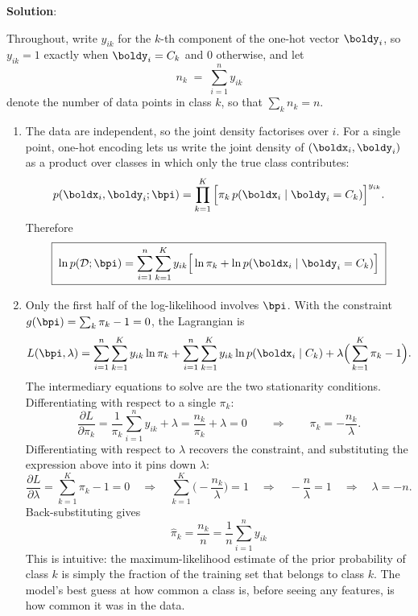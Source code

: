 \documentclass[submit]{../harvardml}
\newenvironment{solution}{
    \vspace{2mm}
    \color{blue}\noindent\textbf{Solution}:
}{}
\begin{document}
\begin{solution}
Throughout, write $y_{ik}$ for the $k$-th component of the one-hot vector
$\boldy_i$, so $y_{ik} = 1$ exactly when $\boldy_i = C_k$ and $0$ otherwise, and let
\[
  n_k \;=\; \sum_{i=1}^{n} y_{ik}
\]
denote the number of data points in class $k$, so that $\sum_k n_k = n$.

\begin{enumerate}

\item
The data are independent, so the joint density factorises over $i$. For a single
point, one-hot encoding lets us write the joint density of $(\boldx_i, \boldy_i)$ as a
product over classes in which only the true class contributes:
\[
  p(\boldx_i, \boldy_i ; \bpi)
  = \prod_{k=1}^{K}\Big[\pi_k \, p(\boldx_i \mid \boldy_i = C_k)\Big]^{y_{ik}} .
\]
Therefore
\[
  \boxed{\;
  \ln p(\mathcal D ; \bpi)
  = \sum_{i=1}^{n}\sum_{k=1}^{K} y_{ik}\Big[\ln \pi_k + \ln p(\boldx_i \mid \boldy_i = C_k)\Big] \; }
\]

\item
Only the first half of the log-likelihood involves $\bpi$. With the constraint
$g(\bpi) = \sum_k \pi_k - 1 = 0$, the Lagrangian is
\[
  L(\bpi, \lambda)
  = \sum_{i=1}^{n}\sum_{k=1}^{K} y_{ik}\ln\pi_k
    + \sum_{i=1}^{n}\sum_{k=1}^{K} y_{ik}\ln p(\boldx_i \mid C_k)
    + \lambda\Big(\sum_{k=1}^{K}\pi_k - 1\Big).
\]
The intermediary equations to solve are the two stationarity conditions. Differentiating
with respect to a single $\pi_k$:
\[
  \frac{\partial L}{\partial \pi_k}
  = \frac{1}{\pi_k}\sum_{i=1}^{n} y_{ik} + \lambda
  = \frac{n_k}{\pi_k} + \lambda = 0
  \qquad\Longrightarrow\qquad
  \pi_k = -\frac{n_k}{\lambda} .
\]
Differentiating with respect to $\lambda$ recovers the constraint, and substituting
the expression above into it pins down $\lambda$:
\[
  \frac{\partial L}{\partial\lambda} = \sum_{k=1}^{K}\pi_k - 1 = 0
  \quad\Longrightarrow\quad
  \sum_{k=1}^{K}\Big(-\frac{n_k}{\lambda}\Big) = 1
  \quad\Longrightarrow\quad
  -\frac{n}{\lambda} = 1
  \quad\Longrightarrow\quad
  \lambda = -n .
\]
Back-substituting gives
\[
  \boxed{\;\hat\pi_k = \frac{n_k}{n} = \frac{1}{n}\sum_{i=1}^{n} y_{ik}\;}
\]
This is intuitive: the maximum-likelihood estimate of the prior probability of class
$k$ is simply the fraction of the training set that belongs to class $k$. The model's
best guess at how common a class is, before seeing any features, is how common it was
in the data.


\end{enumerate}
\end{solution}
\end{document}
